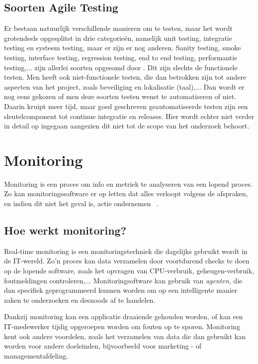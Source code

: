 \subsection{Soorten Agile Testing}
\label{sec:kindsOfTesting}

Er bestaan natuurlijk verschillende manieren om te testen, maar het wordt grotendeels opgesplitst in drie categorieën, namelijk unit testing, integratie testing en systeem testing, maar er zijn er nog anderen. Sanity testing, smoke testing, interface testing, regression testing, end to end testing, performantie testing,... zijn allerlei soorten opgesomd door \textcite{Pittet}. Dit zijn slechts de functionele testen. Men heeft ook niet-functionele testen, die dan betrokken zijn tot andere aspecten van het project, zoals beveiliging en lokalisatie (taal),... Dan wordt er nog eens gekozen of men deze soorten testen wenst te automatiseren of niet. Daarin kruipt meer tijd, maar goed geschreven geautomatiseerde testen zijn een sleutelcomponent tot continue integratie en releases. Hier wordt echter niet verder in detail op ingegaan aangezien dit niet tot de scope van het onderzoek behoort.

\section{Monitoring}
\label{sec:monitoring}

Monitoring is een proces om info en metriek te analyseren van een lopend proces. Zo kan monitoringssoftware er op letten dat alles verloopt volgens de afspraken, en indien dit niet het geval is, actie ondernemen ~\autocite{Rouse2018}. 

\subsection{Hoe werkt monitoring?}
\label{sec:howMonitoringWorks}

Real-time monitoring is een monitoringstechniek die dagelijks gebruikt wordt in de IT-wereld. Zo'n proces kan data verzamelen door voortdurend checks te doen op de lopende software, zoals het opvragen van CPU-verbruik, geheugen-verbruik, foutmeldingen controleren,... Monitoringsoftware kan gebruik van \textit{agenten}, die dan specifiek geprogrammeerd kunnen worden om op een intelligente manier zaken te onderzoeken en desnoods af te handelen.

Dankzij monitoring kan een applicatie draaiende gehouden worden, of kan een IT-medewerker tijdig opgeroepen worden om fouten op te sporen. Monitoring kent ook andere voordelen, zoals het verzamelen van data die dan gebruikt kan worden voor andere doeleinden, bijvoorbeeld voor marketing - of managementafdeling. 

